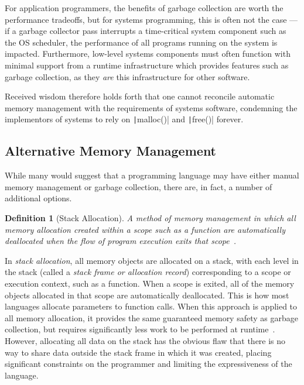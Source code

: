 \documentclass[11pt,a4paper]{article}
\theoremstyle{break}
\newtheorem{defn}{Definition}
\begin{document}
For application programmers, the benefits of garbage collection are worth the performance tradeoffs, but for systems programming, this is often not the case --- if a garbage collector pass interrupts a time-critical system component such as the OS scheduler, the performance of all programs running on the system is impacted. Furthermore, low-level systems components must often function with minimal support from a runtime infrastructure which provides features such as garbage collection, as they \textit{are} this infrastructure for other software.

Received wisdom therefore holds forth that one cannot reconcile automatic memory management with the requirements of systems software, condemning the implementors of systems to rely on \texttt|malloc()| and \texttt|free()| forever.

\subsection{Alternative Memory Management}

While many would suggest that a programming language may have either manual memory management or garbage collection, there are, in fact, a number of additional options.

\begin{defn}[Stack Allocation]
A method of memory management in which all memory allocation created within a scope such as a function are automatically deallocated when the flow of program execution exits that scope~\cite{Corry:2006:OSA:1133956.1133978,Hanson:1990:ESA:91556.91603}.
\end{defn}

In \textit{stack allocation}, all memory objects are allocated on a stack, with each level in the stack (called a \textit{stack frame or \textit{allocation record}}) corresponding to a scope or execution context, such as a function. When a scope is exited, all of the memory objects allocated in that scope are automatically deallocated. This is how most languages allocate parameters to function calls. When this approach is applied to all memory allocation, it provides the same guaranteed memory safety as garbage collection, but requires significantly less work to be performed at runtime~\cite{Corry:2006:OSA:1133956.1133978,Hanson:1990:ESA:91556.91603}. However, allocating all data on the stack has the obvious flaw that there is no way to share data outside the stack frame in which it was created, placing significant constraints on the programmer and limiting the expressiveness of the language.
\end{document}
